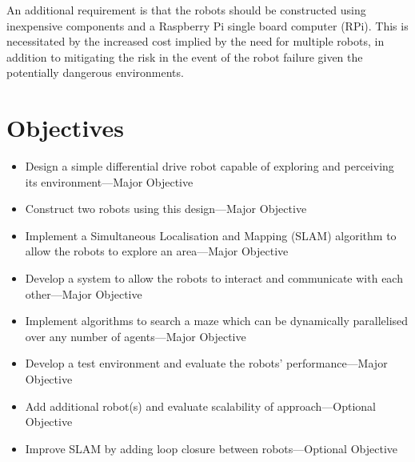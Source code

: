 An additional requirement is that the robots should be constructed using
inexpensive components and a Raspberry Pi single board computer (RPi). This is necessitated by the increased cost implied
by the need for multiple robots, in addition to mitigating the risk in the 
event of the robot failure given the potentially dangerous environments.

\section{Objectives}\label{introduction/objectives}
\begin{itemize}
\item{Design a simple differential drive robot capable of exploring and perceiving its environment---Major Objective}
    \item{Construct two robots using this design---Major Objective}
    \item{Implement a Simultaneous Localisation and Mapping (SLAM) algorithm to allow the robots to explore an area---Major Objective}
    \item{Develop a system to allow the robots to interact and communicate with each other---Major Objective}
    \item{Implement algorithms to search a maze which can be dynamically parallelised over any number of agents---Major Objective}
    \item{Develop a test environment and evaluate the robots’ performance---Major Objective}
    \item{Add additional robot(s) and evaluate scalability of approach---Optional Objective}
    \item{Improve SLAM by adding loop closure between robots---Optional Objective}
\end{itemize}

